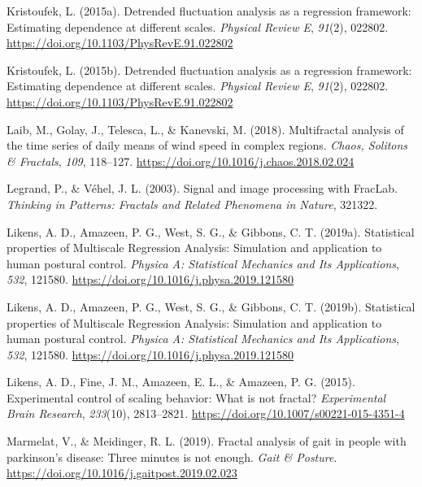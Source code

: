 \documentclass[
  man]{apa6}
\newlength{\cslhangindent}
\newlength{\cslentryspacingunit} %
\newenvironment{CSLReferences}[2] %
 {%
  \setlength{\parindent}{0pt}
  \ifodd #1
  \let\oldpar\par
  \def\par{\hangindent=\cslhangindent\oldpar}
  \fi
  \setlength{\parskip}{#2\cslentryspacingunit}
 }%
 {}
\begin{document}
\begin{CSLReferences}{1}{0}
\leavevmode{}%
Kristoufek, L. (2015a). Detrended fluctuation analysis as a regression framework: {Estimating} dependence at different scales. \emph{Physical Review E}, \emph{91}(2), 022802. \url{https://doi.org/10.1103/PhysRevE.91.022802}

\leavevmode{}%
Kristoufek, L. (2015b). Detrended fluctuation analysis as a regression framework: Estimating dependence at different scales. \emph{Physical Review E}, \emph{91}(2), 022802. \url{https://doi.org/10.1103/PhysRevE.91.022802}

\leavevmode{}%
Laib, M., Golay, J., Telesca, L., \& Kanevski, M. (2018). Multifractal analysis of the time series of daily means of wind speed in complex regions. \emph{Chaos, Solitons \& Fractals}, \emph{109}, 118--127. \url{https://doi.org/10.1016/j.chaos.2018.02.024}

\leavevmode{}%
Legrand, P., \& Véhel, J. L. (2003). Signal and image processing with FracLab. \emph{Thinking in Patterns: Fractals and Related Phenomena in Nature}, 321322.

\leavevmode{}%
Likens, A. D., Amazeen, P. G., West, S. G., \& Gibbons, C. T. (2019a). Statistical properties of {Multiscale} {Regression} {Analysis}: {Simulation} and application to human postural control. \emph{Physica A: Statistical Mechanics and Its Applications}, \emph{532}, 121580. \url{https://doi.org/10.1016/j.physa.2019.121580}

\leavevmode{}%
Likens, A. D., Amazeen, P. G., West, S. G., \& Gibbons, C. T. (2019b). Statistical properties of Multiscale Regression Analysis: Simulation and application to human postural control. \emph{Physica A: Statistical Mechanics and Its Applications}, \emph{532}, 121580. \url{https://doi.org/10.1016/j.physa.2019.121580}

\leavevmode{}%
Likens, A. D., Fine, J. M., Amazeen, E. L., \& Amazeen, P. G. (2015). Experimental control of scaling behavior: What is not fractal? \emph{Experimental Brain Research}, \emph{233}(10), 2813--2821. \url{https://doi.org/10.1007/s00221-015-4351-4}

\leavevmode{}%
Marmelat, V., \& Meidinger, R. L. (2019). Fractal analysis of gait in people with parkinson{'}s disease: Three minutes is not enough. \emph{Gait \& Posture}. \url{https://doi.org/10.1016/j.gaitpost.2019.02.023}


\end{CSLReferences}
\end{document}
